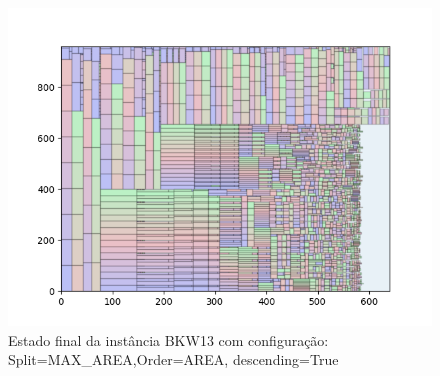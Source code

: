 \begin{figure}[H]
    \centering
    \caption[]{Estado final da instância BKW13 com configuração: Split=MAX_AREA,Order=AREA, descending=True}
    \label{fig:bkw13-max_area-area-true}
    \includegraphics[scale=0.5]{output/figures/bkw/bkw13/max_area/area/true/0000}
\end{figure}